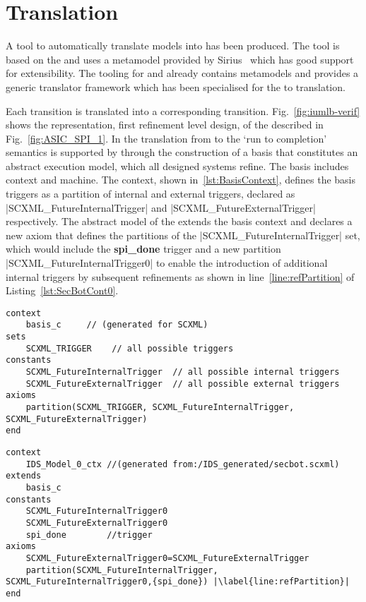 
\section{\SCXML Translation}
\label{sec:translation}

A tool to automatically translate \SCXML models into \iUMLB has been produced. 
The tool is based on the \EMF and uses a \SCXML metamodel provided by Sirius~\cite{siriuswebsite} which has good support for extensibility. 
The tooling for \iUMLB and \EventB already contains \EMF metamodels and provides a generic translator framework which has been specialised for the \SCXML to \iUMLB translation. 

Each \SCXML transition is translated into a corresponding \iUMLB transition. 
Fig.~\ref{fig:iumlb-verif} shows the \iUMLB representation, first refinement level design, of the \IDS described in
Fig.~\ref{fig:ASIC_SPI_1}. 
In the translation from \iUMLB to \EventB the `run to completion' semantics is supported by \EventB through the construction of a basis that constitutes an abstract execution model, which all designed systems refine. 
The basis includes \EventB context and machine. 
The context, shown in~\ref{lst:BasisContext}, defines the basis triggers as a partition of internal and external triggers, declared as |SCXML_FutureInternalTrigger| and |SCXML_FutureExternalTrigger| respectively. 
The abstract model of the \IDS extends the basis context and declares a new axiom that defines the partitions of the |SCXML_FutureInternalTrigger| set, which would include the \textbf{spi\_done} trigger and a new partition |SCXML_FutureInternalTrigger0| to enable the introduction of additional internal triggers by subsequent refinements as shown in line~\ref{line:refPartition} of Listing~\ref{lst:SecBotCont0}. 

\begin{lstlisting}[caption={Abstract basis context},label={lst:BasisContext}, language=Event-B, escapechar=|, frame=single]
context
	basis_c 	// (generated for SCXML)
sets
	SCXML_TRIGGER	 // all possible triggers
constants
	SCXML_FutureInternalTrigger	 // all possible internal triggers
	SCXML_FutureExternalTrigger	 // all possible external triggers  
axioms
	partition(SCXML_TRIGGER, SCXML_FutureInternalTrigger, SCXML_FutureExternalTrigger) 
end
\end{lstlisting}	

\begin{lstlisting}[caption={Context for \IDS abstract model},label={lst:SecBotCont0}, language=Event-B, escapechar=|, frame=single]
context
	IDS_Model_0_ctx //(generated from:/IDS_generated/secbot.scxml)
extends
	basis_c 
constants
	SCXML_FutureInternalTrigger0	
	SCXML_FutureExternalTrigger0
	spi_done	 	//trigger
axioms
	SCXML_FutureExternalTrigger0=SCXML_FutureExternalTrigger
	partition(SCXML_FutureInternalTrigger, SCXML_FutureInternalTrigger0,{spi_done}) |\label{line:refPartition}|
end
\end{lstlisting}

